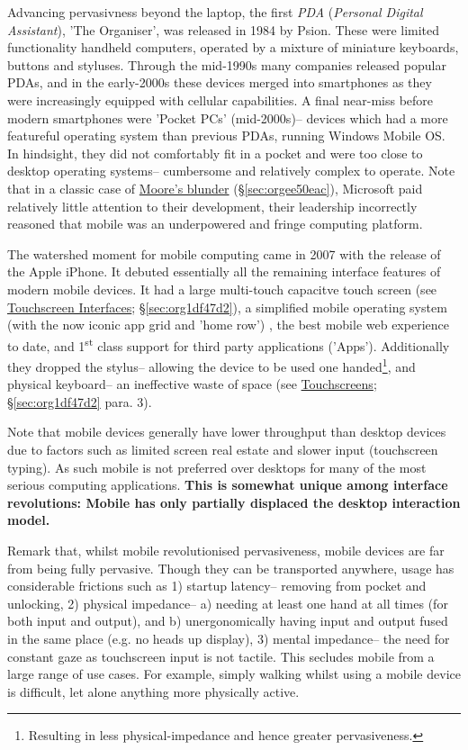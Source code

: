 \documentclass[logo,bsc,singlespacing,parskip]{infthesis}
\begin{document}
Advancing pervasivness beyond the laptop, the first \emph{PDA} (\emph{Personal Digital Assistant}), 'The Organiser', was released in 1984 by Psion.
These were limited functionality handheld computers, operated by a mixture of miniature keyboards, buttons and styluses.
Through the mid-1990s many companies released popular PDAs, and in the early-2000s these devices merged into smartphones as they were increasingly equipped with cellular capabilities.
A final near-miss before modern smartphones were 'Pocket PCs' (mid-2000s)-- devices which had a more featureful operating system than previous PDAs, running Windows Mobile OS.
In hindsight, they did not comfortably fit in a pocket and were too close to desktop operating systems-- cumbersome and relatively complex to operate.
Note that in a classic case of \hyperref[sec:orgee50eac]{Moore's blunder} (\S \ref{sec:orgee50eac}), Microsoft paid relatively little attention to their development, their leadership incorrectly reasoned that mobile was an underpowered and fringe computing platform.

The watershed moment for mobile computing came in 2007 with the release of the Apple iPhone.
It debuted essentially all the remaining interface features of modern mobile devices.
It had a large multi-touch capacitve touch screen (see \hyperref[sec:org1df47d2]{Touchscreen Interfaces}; \S \ref{sec:org1df47d2}), a simplified mobile operating system (with the now iconic app grid and 'home row')  , the best mobile web experience to date, and 1\textsuperscript{st} class support for third party applications ('Apps').
Additionally they dropped the stylus-- allowing the device to be used one handed\footnote{Resulting in less physical-impedance and hence greater pervasiveness.}, and physical keyboard-- an ineffective waste of space (see \hyperref[sec:org1df47d2]{Touchscreens}; \S \ref{sec:org1df47d2} para. 3).

Note that mobile devices generally have lower throughput than desktop devices due to factors such as limited screen real estate and slower input (touchscreen typing).
As such mobile is not preferred over desktops for many of the most serious computing applications.
\textbf{This is somewhat unique among interface revolutions: Mobile has only partially displaced the desktop interaction model.}

Remark that, whilst mobile revolutionised pervasiveness, mobile devices are far from being fully pervasive.
Though they can be transported anywhere, usage has considerable frictions such as 1) startup latency-- removing from pocket and unlocking, 2) physical impedance-- a) needing at least one hand at all times (for both input and output), and b) unergonomically having input and output fused in the same place (e.g. no heads up display), 3) mental impedance-- the need for constant gaze as touchscreen input is not tactile.
This secludes mobile from a large range of use cases.
For example, simply walking whilst using a mobile device is difficult, let alone anything more physically active.
\end{document}
